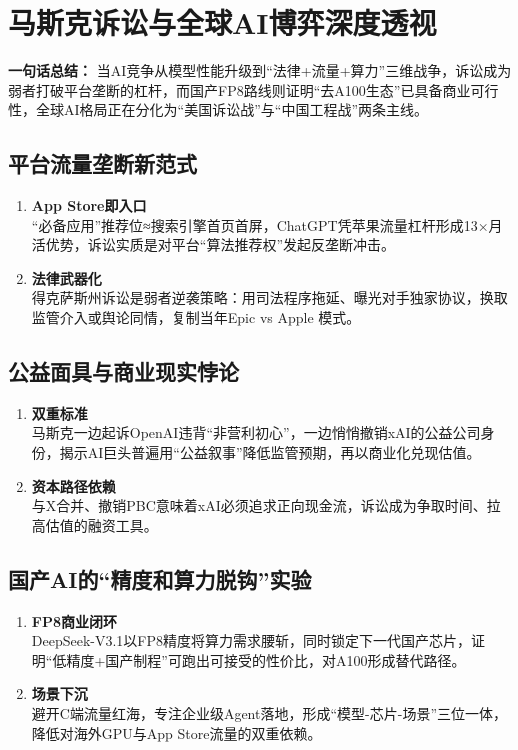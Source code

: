 \section{马斯克诉讼与全球AI博弈深度透视}
\textbf{一句话总结：}  
当AI竞争从模型性能升级到“法律+流量+算力”三维战争，诉讼成为弱者打破平台垄断的杠杆，而国产FP8路线则证明“去A100生态”已具备商业可行性，全球AI格局正在分化为“美国诉讼战”与“中国工程战”两条主线。

\subsection{平台流量垄断新范式}
\begin{enumerate}[leftmargin=*, nosep]
    \item \textbf{App Store即入口}  \\
    “必备应用”推荐位≈搜索引擎首页首屏，ChatGPT凭苹果流量杠杆形成13×月活优势，诉讼实质是对平台“算法推荐权”发起反垄断冲击。
    \item \textbf{法律武器化}  \\
    得克萨斯州诉讼是弱者逆袭策略：用司法程序拖延、曝光对手独家协议，换取监管介入或舆论同情，复制当年Epic vs Apple 模式。
\end{enumerate}

\subsection{公益面具与商业现实悖论}
\begin{enumerate}[leftmargin=*, nosep]
    \item \textbf{双重标准}  \\
    马斯克一边起诉OpenAI违背“非营利初心”，一边悄悄撤销xAI的公益公司身份，揭示AI巨头普遍用“公益叙事”降低监管预期，再以商业化兑现估值。
    \item \textbf{资本路径依赖}  \\
    与X合并、撤销PBC意味着xAI必须追求正向现金流，诉讼成为争取时间、拉高估值的融资工具。
\end{enumerate}

\subsection{国产AI的“精度和算力脱钩”实验}
\begin{enumerate}[leftmargin=*, nosep]
    \item \textbf{FP8商业闭环}  \\
    DeepSeek-V3.1以FP8精度将算力需求腰斩，同时锁定下一代国产芯片，证明“低精度+国产制程”可跑出可接受的性价比，对A100形成替代路径。
    \item \textbf{场景下沉}  \\
    避开C端流量红海，专注企业级Agent落地，形成“模型-芯片-场景”三位一体，降低对海外GPU与App Store流量的双重依赖。
\end{enumerate}

